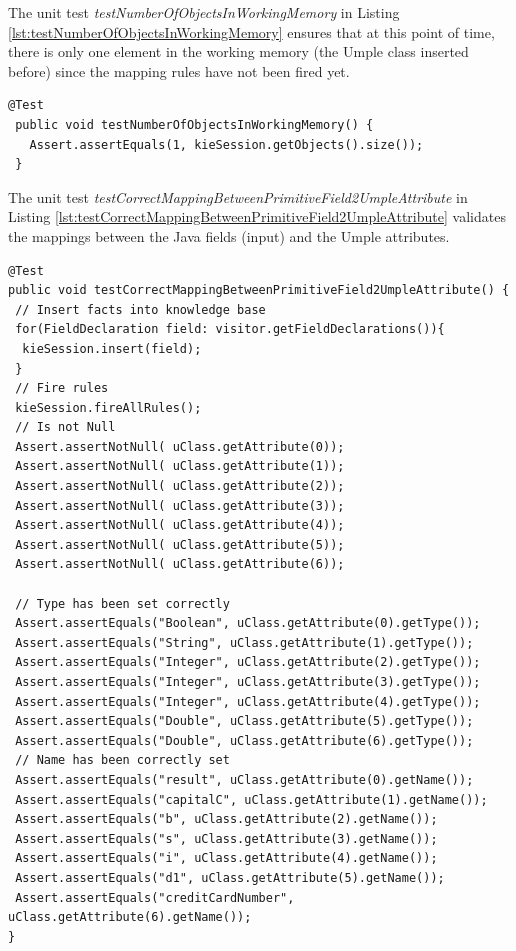 The unit test \textit{testNumberOfObjectsInWorkingMemory} in Listing \ref{lst:testNumberOfObjectsInWorkingMemory} ensures that at this point of time, there is only one element in the working memory (the Umple class inserted  before) since the mapping rules have not been fired yet.

\begin{lstlisting}[style=java, label=lst:testNumberOfObjectsInWorkingMemory, caption=Test asserting the working memory contents]
 @Test
 public void testNumberOfObjectsInWorkingMemory() {
   Assert.assertEquals(1, kieSession.getObjects().size());
 }
\end{lstlisting}

The unit test \textit{testCorrectMappingBetweenPrimitiveField2UmpleAttribute} in Listing \ref{lst:testCorrectMappingBetweenPrimitiveField2UmpleAttribute} validates the mappings between the Java fields (input) and the Umple attributes. 
\begin{lstlisting}[style=java, label=lst:testCorrectMappingBetweenPrimitiveField2UmpleAttribute, caption=Test asserting mappings of fields and attributes]
@Test
public void testCorrectMappingBetweenPrimitiveField2UmpleAttribute() {
 // Insert facts into knowledge base
 for(FieldDeclaration field: visitor.getFieldDeclarations()){
  kieSession.insert(field);
 }
 // Fire rules
 kieSession.fireAllRules();
 // Is not Null
 Assert.assertNotNull( uClass.getAttribute(0));
 Assert.assertNotNull( uClass.getAttribute(1));
 Assert.assertNotNull( uClass.getAttribute(2));
 Assert.assertNotNull( uClass.getAttribute(3));
 Assert.assertNotNull( uClass.getAttribute(4));
 Assert.assertNotNull( uClass.getAttribute(5));
 Assert.assertNotNull( uClass.getAttribute(6));

 // Type has been set correctly
 Assert.assertEquals("Boolean", uClass.getAttribute(0).getType());
 Assert.assertEquals("String", uClass.getAttribute(1).getType());
 Assert.assertEquals("Integer", uClass.getAttribute(2).getType());
 Assert.assertEquals("Integer", uClass.getAttribute(3).getType());
 Assert.assertEquals("Integer", uClass.getAttribute(4).getType());
 Assert.assertEquals("Double", uClass.getAttribute(5).getType());
 Assert.assertEquals("Double", uClass.getAttribute(6).getType());
 // Name has been correctly set
 Assert.assertEquals("result", uClass.getAttribute(0).getName());
 Assert.assertEquals("capitalC", uClass.getAttribute(1).getName());
 Assert.assertEquals("b", uClass.getAttribute(2).getName());
 Assert.assertEquals("s", uClass.getAttribute(3).getName());
 Assert.assertEquals("i", uClass.getAttribute(4).getName());
 Assert.assertEquals("d1", uClass.getAttribute(5).getName());
 Assert.assertEquals("creditCardNumber", uClass.getAttribute(6).getName());
}
\end{lstlisting}
